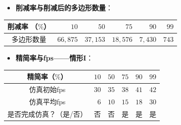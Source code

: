 \begin{frame}
\begin{itemize}
  \item \textbf{削减率与削减后的多边形数量}：
\end{itemize}
\begin{table}[h]
\renewcommand{\arraystretch}{0.5}
\centering
\begin{tabular*}{100mm}{c r r r r r}
\toprule
\hspace{2mm} \small{削减率 （$\%$）}  &     \small{$10$} &     \small{$50$} &     \small{$75$} &    \small{$90$} &  \small{$99$} \\
\midrule
\hspace{2mm} \small{多边形数量}     & \small{$66,875$} & \small{$37,153$} & \small{$18,576$} & \small{$7,430$} & \small{$743$} \\
\bottomrule
\end{tabular*}
\end{table}
\end{frame}

\begin{frame}
\begin{itemize}
  \item \textbf{精简率与fps——情形I}：
\end{itemize}
\begin{table}[t]
\renewcommand{\arraystretch}{0.5}
\centering
\begin{tabular*}{100mm}{c r r r r r}
\toprule
\hspace{5mm} \small{精简率（$\%$）}           & \small{$10$} & \small{$50$} & \small{$75$} & \small{$90$} & \small{$99$} \\
\midrule
\hspace{5mm} \small{仿真初始fps}              & \small{$30$} & \small{$35$} & \small{$38$} & \small{$41$} & \small{$42$} \\
\midrule
\hspace{5mm} \small{仿真平均fps}              &  \small{$6$} & \small{$10$} & \small{$15$} & \small{$18$} & \small{$30$} \\
\midrule
\hspace{5mm} \small{是否完成仿真？（是/否）}  &  \small{否}  &  \small{否}  & \small{是}   & \small{是}   & \small{是}   \\
\bottomrule
\end{tabular*}
\end{table}
\end{frame}

